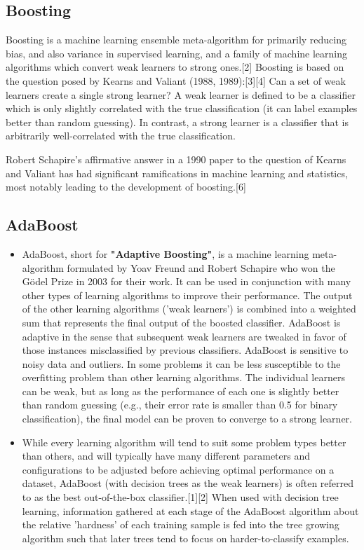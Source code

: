 \subsection{Boosting}

Boosting is a machine learning ensemble meta-algorithm for primarily reducing bias, and also variance in supervised learning, and a family of machine learning algorithms which convert weak learners to strong ones.[2] Boosting is based on the question posed by Kearns and Valiant (1988, 1989):[3][4] Can a set of weak learners create a single strong learner? A weak learner is defined to be a classifier which is only slightly correlated with the true classification (it can label examples better than random guessing). In contrast, a strong learner is a classifier that is arbitrarily well-correlated with the true classification.

Robert Schapire's affirmative answer in a 1990 paper to the question of Kearns and Valiant has had significant ramifications in machine learning and statistics, most notably leading to the development of boosting.[6]


\subsection{AdaBoost}
\begin{itemize}
\item AdaBoost, short for \textbf{"Adaptive Boosting"}, is a machine learning meta-algorithm formulated by Yoav Freund and Robert Schapire who won the Gödel Prize in 2003 for their work. It can be used in conjunction with many other types of learning algorithms to improve their performance. The output of the other learning algorithms ('weak learners') is combined into a weighted sum that represents the final output of the boosted classifier. AdaBoost is adaptive in the sense that subsequent weak learners are tweaked in favor of those instances misclassified by previous classifiers. AdaBoost is sensitive to noisy data and outliers. In some problems it can be less susceptible to the overfitting problem than other learning algorithms. The individual learners can be weak, but as long as the performance of each one is slightly better than random guessing (e.g., their error rate is smaller than 0.5 for binary classification), the final model can be proven to converge to a strong learner.
\item 
While every learning algorithm will tend to suit some problem types better than others, and will typically have many different parameters and configurations to be adjusted before achieving optimal performance on a dataset, AdaBoost (with decision trees as the weak learners) is often referred to as the best out-of-the-box classifier.[1][2] When used with decision tree learning, information gathered at each stage of the AdaBoost algorithm about the relative 'hardness' of each training sample is fed into the tree growing algorithm such that later trees tend to focus on harder-to-classify examples.
\end{itemize}


